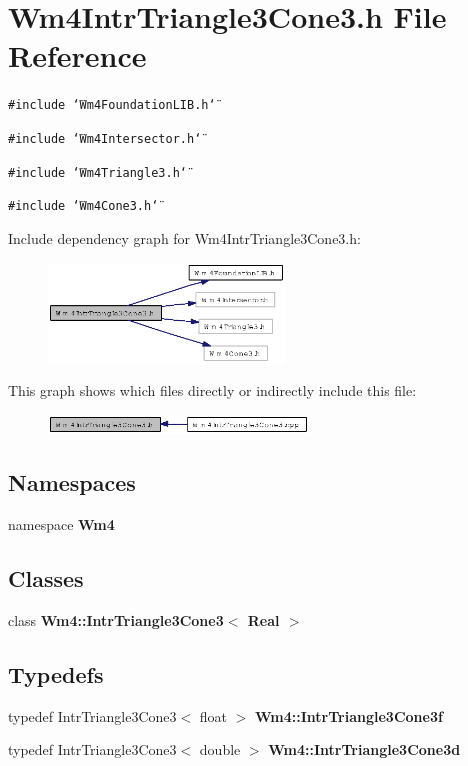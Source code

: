 \section{Wm4Intr\-Triangle3Cone3.h File Reference}
\label{Wm4IntrTriangle3Cone3_8h}
{\tt \#include \char`\"{}Wm4Foundation\-LIB.h\char`\"{}}\par
{\tt \#include \char`\"{}Wm4Intersector.h\char`\"{}}\par
{\tt \#include \char`\"{}Wm4Triangle3.h\char`\"{}}\par
{\tt \#include \char`\"{}Wm4Cone3.h\char`\"{}}\par


Include dependency graph for Wm4Intr\-Triangle3Cone3.h:\begin{figure}[H]
\begin{center}
\leavevmode
\includegraphics[width=178pt]{Wm4IntrTriangle3Cone3_8h__incl}
\end{center}
\end{figure}


This graph shows which files directly or indirectly include this file:\begin{figure}[H]
\begin{center}
\leavevmode
\includegraphics[width=196pt]{Wm4IntrTriangle3Cone3_8h__dep__incl}
\end{center}
\end{figure}
\subsection*{Namespaces}
\begin{CompactItemize}
\item 
namespace {\bf Wm4}
\end{CompactItemize}
\subsection*{Classes}
\begin{CompactItemize}
\item 
class {\bf Wm4::Intr\-Triangle3Cone3$<$ Real $>$}
\end{CompactItemize}
\subsection*{Typedefs}
\begin{CompactItemize}
\item 
typedef Intr\-Triangle3Cone3$<$ float $>$ {\bf Wm4::Intr\-Triangle3Cone3f}
\item 
typedef Intr\-Triangle3Cone3$<$ double $>$ {\bf Wm4::Intr\-Triangle3Cone3d}
\end{CompactItemize}
